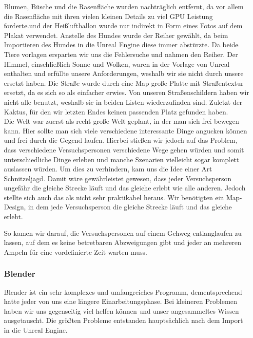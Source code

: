 \documentclass{Bericht}
\begin{document}
		Blumen, Büsche und die Rasenfläche wurden nachträglich entfernt, da vor allem die Rasenfläche mit ihren vielen kleinen Details zu viel GPU Leistung forderte.und der Heißluftballon wurde nur indirekt in Form eines Fotos auf dem Plakat verwendet. 
 		Anstelle des Hundes wurde der Reiher gewählt, da beim Importieren des Hundes in die Unreal Engine diese immer abstürzte. Da beide Tiere vorlagen ersparten wir uns die Fehlersuche und nahmen den Reiher. 
		Der Himmel, einschließlich Sonne und Wolken, waren in der Vorlage von Unreal enthalten und erfüllte unsere Anforderungen, weshalb wir sie nicht durch unsere ersetzt haben. 
		Die Straße wurde durch eine Map-große Platte mit Straßentextur ersetzt, da es sich so als einfacher erwies. 
		Von unseren Straßenschildern haben wir nicht alle benutzt, weshalb sie in beiden Listen wiederzufinden sind. 
		Zuletzt der Kaktus, für den wir letzten Endes keinen passenden Platz gefunden haben. \\

		Die Welt war zuerst als recht große Welt geplant, in der man sich frei bewegen kann. Hier sollte man sich viele verschiedene interessante Dinge angucken können und frei durch die Gegend laufen. Hierbei stießen wir jedoch auf das Problem, dass verschiedene Versuchspersonen verschiedene Wege gehen würden und somit unterschiedliche Dinge erleben und manche Szenarien vielleicht sogar komplett auslassen würden. Um dies zu verhindern, kam uns die Idee einer Art Schnitzeljagd. Damit wäre gewährleistet gewesen, dass jeder Versuchsperson ungefähr die gleiche Strecke läuft und das gleiche erlebt wie alle anderen. Jedoch stellte sich auch das als nicht sehr praktikabel heraus. Wir benötigten ein Map-Design, in dem jede Versuchsperson die gleiche Strecke läuft und das gleiche erlebt.

		So kamen wir darauf, die Versuchspersonen auf einem Gehweg entlanglaufen zu lassen, auf dem es keine betretbaren Abzweigungen gibt und jeder an mehreren Ampeln für eine vordefinierte Zeit warten muss. 
		
		\subsubsection{Blender}
			Blender ist ein sehr komplexes und umfangreiches Programm, dementsprechend hatte jeder von uns eine längere Einarbeitungsphase. Bei kleineren Problemen haben wir uns gegenseitig viel helfen können und unser angesammeltes Wissen ausgetauscht. Die größten Probleme entstanden hauptsächlich nach dem Import in die Unreal Engine. 
\end{document}
